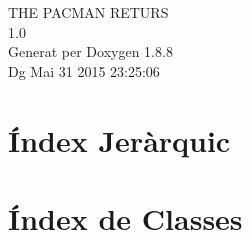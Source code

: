 \documentclass[twoside]{book}
\newcommand{\+}{\discretionary{\mbox{\scriptsize$\hookleftarrow$}}{}{}}
\newcommand{\clearemptydoublepage}{%
  \newpage{\pagestyle{empty}\cleardoublepage}%
}
\begin{document}
\hypersetup{pageanchor=false,
             bookmarks=true,
             bookmarksnumbered=true,
             pdfencoding=unicode
            }
\begin{titlepage}
\vspace*{7cm}
\begin{center}%
{\Large T\+H\+E P\+A\+C\+M\+A\+N R\+E\+T\+U\+R\+S \\[1ex]\large 1.\+0 }\\
\vspace*{1cm}
{\large Generat per Doxygen 1.8.8}\\
\vspace*{0.5cm}
{\small Dg Mai 31 2015 23:25:06}\\
\end{center}
\end{titlepage}
\clearemptydoublepage
\tableofcontents
\clearemptydoublepage
{}
\hypersetup{pageanchor=true}

\chapter{Índex Jeràrquic}

\chapter{Índex de Classes}

\end{document}
